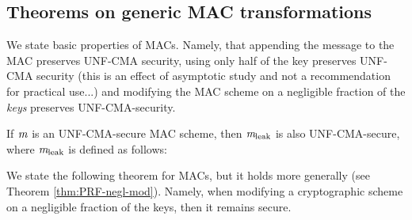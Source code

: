 \subsection{Theorems on generic MAC transformations}
We state basic properties of MACs. Namely, that appending the message to the MAC preserves UNF-CMA security, using only half of the key preserves UNF-CMA security (this is an effect of asymptotic study and not a recommendation for practical use...) and modifying the MAC
scheme on a negligible fraction of the \emph{keys} preserves UNF-CMA-security.

\begin{theorem}
    If $\mathit{{m}}$ is an UNF-CMA-secure MAC scheme, then $\mathit{{m}}_{\text{leak}}$ is also UNF-CMA-secure, where $\mathit{{m}}_{\text{leak}}$ is defined as follows:
    \begin{center}
        \begin{pchstack}
            \pchspace
        \end{pchstack}
    \end{center}
\end{theorem}

We state the following theorem for MACs, but it holds more generally (see Theorem \ref{thm:PRF-negl-mod}). Namely, when modifying a cryptographic scheme on a negligible fraction of the keys, then it remains secure.


